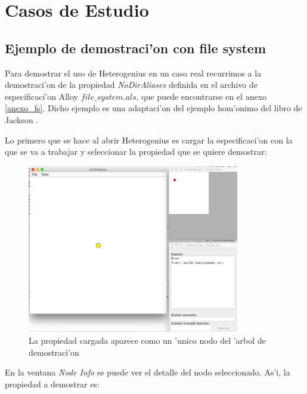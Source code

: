 \chapter{Casos de Estudio}
\section{Ejemplo de demostraci'on con file system}

Para demostrar el uso de Heterogenius en un caso real recurrimos a la demostraci'on de la propiedad \textit{NoDirAliases} definida en el archivo de especificaci'on Alloy \textit{$file\_system.als$}, que puede encontrarse en el anexo \ref{anexo_fs}. Dicho ejemplo es una adaptaci'on del ejemplo hom'onimo del libro de Jackson \cite{alloy}.

Lo primero que se hace al abrir Heterogenius es cargar la especificaci'on con la que se va a trabajar y seleccionar la propiedad que se quiere demostrar:

\begin{figure}[H]
	\includegraphics[width=350px]{img/ejemplo/3.png}
	\centering
	\caption{La propiedad cargada aparece como un 'unico nodo del 'arbol de demostraci'on}
\end{figure}

En la ventana \textit{Node Info} se puede ver el detalle del nodo seleccionado. As'i, la propiedad a demostrar es:

